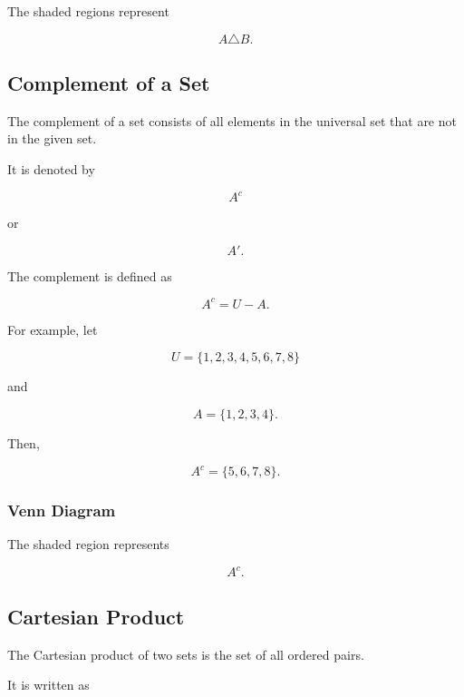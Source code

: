 \documentclass[12pt,a4paper]{article}
\begin{document}
The shaded regions represent

\[
A\triangle B.
\]


\subsection{Complement of a Set}

The complement of a set consists of all elements in the universal set
that are not in the given set.

It is denoted by

\[
A^c
\]

or

\[
A'.
\]

The complement is defined as

\[
A^c=U-A.
\]

For example, let

\[
U=\{1,2,3,4,5,6,7,8\}
\]

and

\[
A=\{1,2,3,4\}.
\]

Then,

\[
A^c=\{5,6,7,8\}.
\]

\subsubsection*{Venn Diagram}

\begin{center}
\end{center}

The shaded region represents

\[
A^c.
\]


\subsection{Cartesian Product}

The Cartesian product of two sets is the set of all ordered pairs.

It is written as
\end{document}
